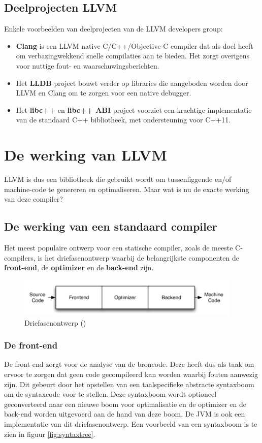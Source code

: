 \subsection{Deelprojecten LLVM}
Enkele voorbeelden van deelprojecten van de LLVM developers group:
\begin{itemize}
	\item \textbf{Clang} is een LLVM native C/C++/Objective-C compiler dat als doel heeft om verbazingwekkend snelle compilaties aan te bieden. Het zorgt overigens voor nuttige fout- en waarschuwingsberichten.
	\newline
	\item Het \textbf{LLDB} project bouwt verder op libraries die aangeboden worden door LLVM en Clang om te zorgen voor een native debugger.
	\newline
	\item Het \textbf{libc++} en \textbf{libc++ ABI} project voorziet een krachtige implementatie van de standaard C++ bibliotheek, met ondersteuning voor C++11. 
\end{itemize}

\section{De werking van LLVM}
LLVM is dus een bibliotheek die gebruikt wordt om tussenliggende en/of machine-code te genereren en optimaliseren. Maar wat is nu de exacte werking van deze compiler?

\subsection{De werking van een standaard compiler}
Het meest populaire ontwerp voor een statische compiler, zoals de meeste C-compilers, is het driefasenontwerp waarbij de belangrijkste componenten de \textbf{front-end}, de \textbf{optimizer} en de \textbf{back-end} zijn. 

\begin{figure} [ht]
	\centering
	\includegraphics[width=0.95\textwidth]{img/driefasenmodel}
	\caption{Driefasenontwerp (\cite{aosa})}
	\label{fig:driefasenontwerp}
\end{figure}

\subsubsection{De front-end}
De front-end zorgt voor de analyse van de broncode. Deze heeft dus als taak om ervoor te zorgen dat geen code gecompileerd kan worden waarbij fouten aanwezig zijn. Dit gebeurt door het opstellen van een taalspecifieke abstracte syntaxboom om de syntaxcode voor te stellen. Deze syntaxboom wordt optioneel geconverteerd naar een nieuwe boom voor optimalisatie en de optimizer en de back-end worden uitgevoerd aan de hand van deze boom. De JVM is ook een implementatie van dit driefasenontwerp. Een voorbeeld van een syntaxboom is te zien in figuur \ref{fig:syntaxtree}.

